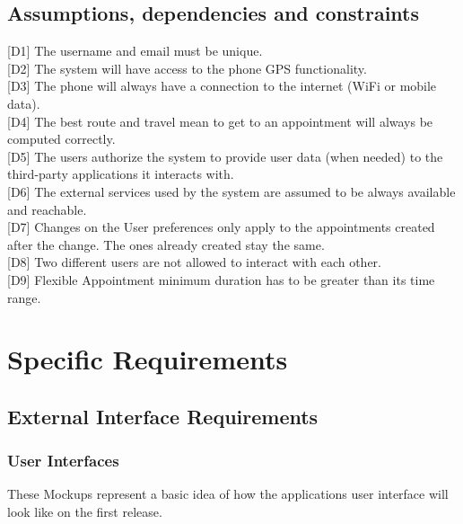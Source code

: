 \documentclass[12pt]{article}
\begin{document}
\subsection{Assumptions, dependencies and constraints}
[D1] The username and email must be unique.\\{}
[D2] The system will have access to the phone GPS functionality.\\{}
[D3] The phone will always have a connection to the internet (WiFi or mobile data).\\{}
[D4] The best route and travel mean to get to an appointment will always be computed correctly.\\{}
[D5] The users authorize the system to provide user data (when needed) to the third-party applications it interacts with.\\{}
[D6] The external services used by the system are assumed to be always available and reachable.\\{}
[D7] Changes on the User preferences only apply to the appointments created after the change. The ones already created stay the same.\\{}
[D8] Two different users are not allowed to interact with each other.\\{}
[D9] Flexible Appointment minimum duration has to be greater than its time range.\\{}


\section{Specific Requirements}

\subsection{External Interface Requirements}

\subsubsection{User Interfaces}
These Mockups represent a basic idea of how the applications user interface will look like on the first release.
\end{document}
